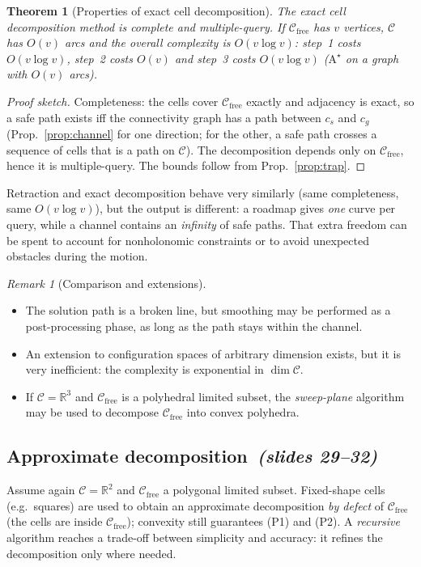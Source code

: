 \documentclass[11pt,a4paper]{article}
\newcommand{\Cspace}{\mathcal{C}}
\newcommand{\Cfree}{\mathcal{C}_{\mathrm{free}}}
\newcommand{\R}{\mathbb{R}}
\newcommand{\slides}[1]{\emph{(slides #1)}}
\newcommand{\subsect}[2]{\subsection{#1\texorpdfstring{\ \slides{#2}}{ (slides #2)}}}
\theoremstyle{definition}
\theoremstyle{plain}
\newtheorem{theorem}[definition]{Theorem}
\theoremstyle{remark}
\newtheorem{remark}[definition]{Remark}
\begin{document}
\begin{theorem}[Properties of exact cell decomposition]
\label{thm:exact-props}
The exact cell decomposition method is complete and multiple-query. If $\Cfree$ has $v$ vertices, $\mathcal{C}$ has $O(v)$ arcs and the overall complexity is $O(v\log v)$: step~1 costs $O(v\log v)$, step~2 costs $O(v)$ and step~3 costs $O(v\log v)$ ($\mathrm{A}^\star$ on a graph with $O(v)$ arcs).
\end{theorem}
\begin{proof}[Proof sketch]
Completeness: the cells cover $\Cfree$ exactly and adjacency is exact, so a safe path exists iff the connectivity graph has a path between $c_s$ and $c_g$ (Prop.~\ref{prop:channel} for one direction; for the other, a safe path crosses a sequence of cells that is a path on $\mathcal{C}$). The decomposition depends only on $\Cfree$, hence it is multiple-query. The bounds follow from Prop.~\ref{prop:trap}.
\end{proof}

\begin{intuition}
Retraction and exact decomposition behave very similarly (same completeness, same $O(v\log v)$), but the output is different: a roadmap gives \emph{one} curve per query, while a channel contains an \emph{infinity} of safe paths. That extra freedom can be spent to account for nonholonomic constraints or to avoid unexpected obstacles during the motion.
\end{intuition}

\begin{remark}[Comparison and extensions]
\leavevmode
\begin{itemize}
  \item The solution path is a broken line, but smoothing may be performed as a post-processing phase, as long as the path stays within the channel.
  \item An extension to configuration spaces of arbitrary dimension exists, but it is very inefficient: the complexity is exponential in $\dim\Cspace$.
  \item If $\Cspace=\R^3$ and $\Cfree$ is a polyhedral limited subset, the \emph{sweep-plane} algorithm may be used to decompose $\Cfree$ into convex polyhedra.
\end{itemize}
\end{remark}

\subsect{Approximate decomposition}{29--32}

Assume again $\Cspace=\R^2$ and $\Cfree$ a polygonal limited subset. Fixed-shape cells (e.g.\ squares) are used to obtain an approximate decomposition \emph{by defect} of $\Cfree$ (the cells are inside $\Cfree$); convexity still guarantees (P1) and (P2). A \emph{recursive} algorithm reaches a trade-off between simplicity and accuracy: it refines the decomposition only where needed.
\end{document}
